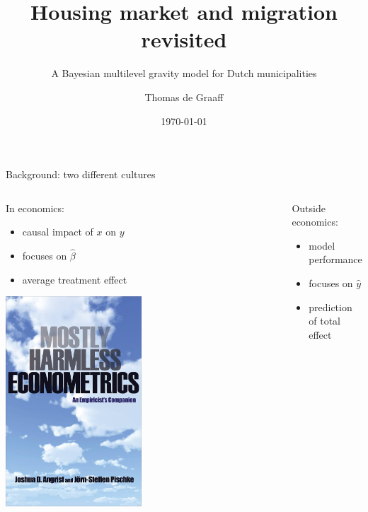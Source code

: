 \documentclass{beamer}
\title{Housing market and migration revisited}
\subtitle{A  Bayesian multilevel gravity model for Dutch municipalities}
\date{\today}
\author{Thomas de Graaff}
\institute{Vrije Universiteit Amsterdam\\Tinbergen Institute Amsterdam}
\begin{document}
\maketitle

\begin{frame}{Background: two different cultures \citep{breiman2001statistical}}
\begin{columns}
	\begin{column}{0.5\textwidth}
		In economics: 
		\begin{itemize}
			\item \alert{causal} impact of $x$ on $y$
			\item \alert{focuses} on $\hat{\beta}$
			\item \alert{average} treatment effect
		\end{itemize}
		\begin{center}
			\includegraphics[width=0.5\textwidth]{../fig/harmless}      
		\end{center}
	\end{column}\pause
	\begin{column}{0.5\textwidth} 
		Outside economics: 
		\begin{itemize}
			\item \alert{model performance } 
			\item \alert{focuses} on $\hat{y}$
			\item \alert{prediction} of total effect
		\end{itemize}
		\begin{center}

\end{center}
\end{column}
\end{columns}
\end{frame}
\end{document}
